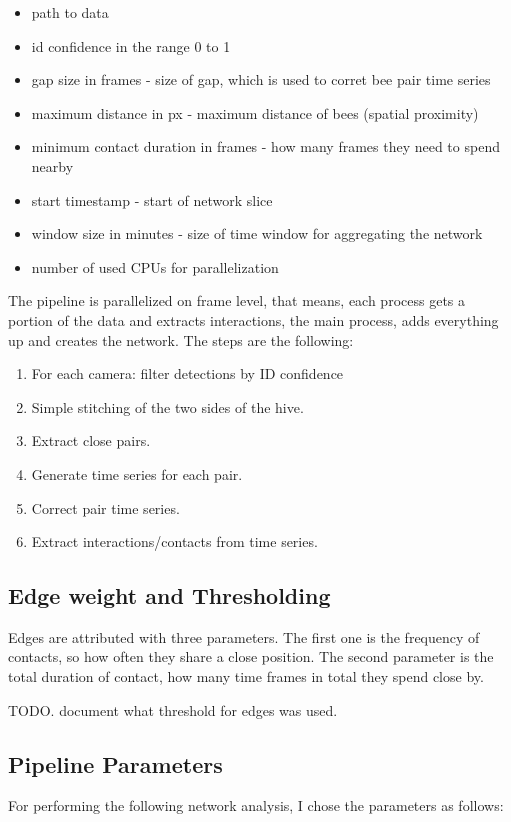 \begin{itemize}
\item path to data
\item id confidence in the range 0 to 1
\item gap size in frames - size of gap, which is used to corret bee pair time series
\item maximum distance in px - maximum distance of bees (spatial proximity)
\item minimum contact duration in frames - how many frames they need to spend nearby
\item start timestamp - start of network slice
\item window size in minutes - size of time window for aggregating the network
\item number of used CPUs for parallelization
\end{itemize}

The pipeline is parallelized on frame level, that means, each process gets a portion of the data and extracts interactions, the main process, adds everything up and creates the network. The steps are the following:

\begin{enumerate}
\item For each camera: filter detections by ID confidence
\item Simple stitching of the two sides of the hive.
\item Extract close pairs.
\item Generate time series for each pair.
\item Correct pair time series.
\item Extract interactions/contacts from time series.
\end{enumerate}


\subsection{Edge weight and Thresholding}
Edges are attributed with three parameters. The first one is the frequency of contacts, so how often they share a close position. The second parameter is the total duration of contact, how many time frames in total they spend close by.
 
TODO. document what threshold for edges was used.

\subsection{Pipeline Parameters}
For performing the following network analysis, I chose the parameters as follows:

